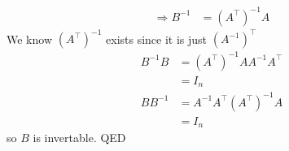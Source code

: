 \documentclass[11pt]{article}
\begin{document}
\begin{enumerate}[{\bf Q1.}]
\begin{enumerate}
$$\begin{aligned}
			\Rightarrow B^{-1} & =\left(A^{\top}\right)^{-1} A
			\end{aligned}
			$$
			We know $\left(A^{\top}\right)^{-1}$ exists since it is just $\left(A^{-1}\right)^{\top}$
			$$
			\begin{aligned}
			B^{-1} B & =\left(A^{\top}\right)^{-1} A A^{-1} A^{\top} \\
			& =I_n \\
			B B^{-1} & =A^{-1} A^{\top}\left(A^{\top}\right)^{-1} A \\
			& =I_n
			\end{aligned}
			$$
			so $B$ is invertable. \newline
			QED
		\end{enumerate}
		
	\end{enumerate}
\end{document}
